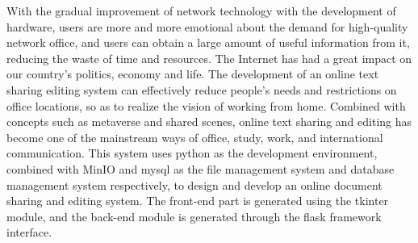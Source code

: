 \begin{enabstract}
With the gradual improvement of network technology with the development of hardware, users are more and more emotional about the demand for high-quality network office, and users can obtain a large amount of useful information from it, reducing the waste of time and resources. The Internet has had a great impact on our country's politics, economy and life. The development of an online text sharing editing system can effectively reduce people's needs and restrictions on office locations, so as to realize the vision of working from home. Combined with concepts such as metaverse and shared scenes, online text sharing and editing has become one of the mainstream ways of office, study, work, and international communication. This system uses python as the development environment, combined with MinIO and mysql as the file management system and database management system respectively, to design and develop an online document sharing and editing system. The front-end part is generated using the tkinter module, and the back-end module is generated through the flask framework interface.
	
	
\end{enabstract}
\par
\vspace*{2em}
\\

\newpage
\cleardoublepage

\renewcommand{\baselinestretch}{1.5}
